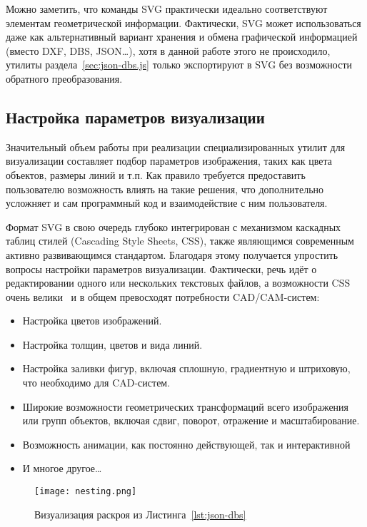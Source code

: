 Можно заметить,
что команды SVG
практически идеально соответствуют
элементам геометрической информации.
Фактически,
SVG может использоваться даже
как альтернативный вариант
хранения и обмена графической информацией
(вместо DXF, DBS, JSON\dots),
хотя в данной работе этого не происходило,
утилиты раздела~\ref{sec:json-dbs.js}
только экспортируют в SVG
без возможности обратного преобразования.

\subsection{Настройка параметров визуализации}

Значительный объем работы при реализации
специализированных утилит для визуализации
составляет подбор параметров изображения,
таких как цвета объектов, размеры линий
и т.п.
Как правило требуется предоставить пользователю
возможность влиять на такие решения,
что дополнительно усложняет и сам программный код
и взаимодействие с ним пользователя.

Формат SVG
в свою очередь глубоко интегрирован с механизмом
каскадных таблиц стилей
(Cascading Style Sheets, CSS),
также являющимся современным
активно развивающимся стандартом.
Благодаря этому получается
упростить вопросы настройки параметров визуализации.
Фактически,
речь идёт о редактировании одного или нескольких
текстовых файлов,
а возможности CSS очень велики~\cite{bi:CSS}
и в общем превосходят
потребности CAD/CAM-систем:
\begin{itemize}
  \item Настройка цветов изображений.
  \item Настройка толщин, цветов и вида линий.
  \item Настройка заливки фигур,
  включая сплошную, градиентную
  и штриховую,
  что необходимо для CAD-систем.
  \item Широкие возможности геометрических трансформаций
  всего изображения или групп объектов,
  включая сдвиг, поворот, отражение и масштабирование.
  \item Возможность анимации,
  как постоянно действующей,
  так и интерактивной
  \item И многое другое\dots
\end{itemize}

\begin{figure}
  \centering
  \texttt{[image: nesting.png]}
  \caption{Визуализация раскроя из Листинга~\ref{lst:json-dbs}}
  \label{fig:json-nesting}
\end{figure}

